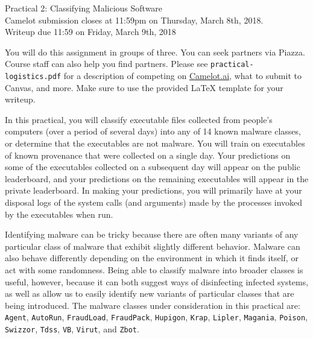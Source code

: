 \documentclass[12pt]{article}
\begin{document}
\begin{center}
{\Large Practical 2: Classifying Malicious Software}\\

Camelot submission closes at 11:59pm on Thursday, March 8th, 2018.\\
Writeup due 11:59 on Friday, March 9th, 2018\\
\end{center}


\noindent You will do this assignment in groups of three. You can seek partners via Piazza. Course staff can also help you find partners. 
Please see \texttt{practical-logistics.pdf} for a description
of competing on \href{https://portal.camelot.ai}{Camelot.ai}, what to submit to Canvas, and more. 
Make sure to use the provided \LaTeX \hspace{1pt} template for your writeup.
        

In this practical, you will classify executable files collected from people's computers (over a period of several days) into any of 14 known malware classes, 
or determine that the executables are not malware.  You will train on executables of known provenance that were collected on a single day. 
Your predictions on some of the executables collected on a subsequent day will appear on the public leaderboard, 
and your predictions on the remaining executables will appear in the private leaderboard. In making your predictions, 
you will primarily have at your disposal logs of the system calls (and arguments) made by the processes invoked by the executables when run.

Identifying malware can be tricky because there are often many variants of any particular class of malware that exhibit slightly different behavior. Malware can also behave differently depending on the environment in which it finds itself, or act with some randomness. Being able to classify malware into broader classes is useful, however, because it can both suggest ways of disinfecting infected systems, as well as allow us to easily identify new variants of particular classes that are being introduced. The malware classes under consideration in this practical are: \texttt{Agent}, \texttt{AutoRun}, \texttt{FraudLoad}, \texttt{FraudPack}, \texttt{Hupigon}, \texttt{Krap}, \texttt{Lipler}, \texttt{Magania}, \texttt{Poison}, \texttt{Swizzor}, \texttt{Tdss}, \texttt{VB}, \texttt{Virut}, and \texttt{Zbot}.
\end{document}
